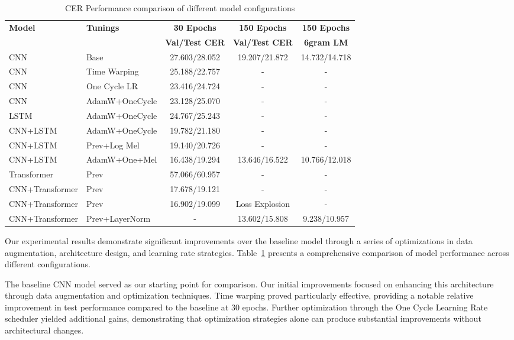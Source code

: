 \documentclass{article}
\begin{document}
\begin{table}
  \caption{CER Performance comparison of different model configurations}
  \label{tab:model_performance}
  \centering
  \begin{tabular}{lp{2.8cm}ccc}
  \toprule
  \textbf{Model} & \textbf{Tunings} & \textbf{30 Epochs} & \textbf{150 Epochs} & \textbf{150 Epochs} \\
  & & \textbf{Val/Test CER} & \textbf{Val/Test CER} & \textbf{6gram LM} \\
  \midrule
  CNN & Base & 27.603/28.052 & 19.207/21.872 & 14.732/14.718 \\
  CNN & Time Warping & 25.188/22.757 & - & - \\
  CNN & One Cycle LR & 23.416/24.724 & - & - \\
  CNN & AdamW+OneCycle & 23.128/25.070 & - & - \\
  LSTM & AdamW+OneCycle & 24.767/25.243 & - & - \\
  CNN+LSTM & AdamW+OneCycle & 19.782/21.180 & - & - \\
  CNN+LSTM & Prev+Log Mel & 19.140/20.726 & - & - \\
  CNN+LSTM & AdamW+One+Mel & 16.438/19.294 & 13.646/16.522 & 10.766/12.018\\
  Transformer & Prev & 57.066/60.957 & - & - \\
  CNN+Transformer & Prev & 17.678/19.121 & - & - \\
  CNN+Transformer & Prev & 16.902/19.099 & Loss Explosion & - \\
  CNN+Transformer & Prev+LayerNorm & - & 13.602/15.808 & 9.238/10.957 \\
  \bottomrule
  \end{tabular}
  \end{table}
  
  
  \sloppy
  Our experimental results demonstrate significant improvements over the baseline model through a series of optimizations in data augmentation, architecture design, and learning rate strategies. Table~\ref{tab:model_performance} presents a comprehensive comparison of model performance across different configurations.

  The baseline CNN model served as our starting point for comparison. Our initial improvements focused on enhancing this architecture through data augmentation and optimization techniques. Time warping proved particularly effective, providing a notable relative improvement in test performance compared to the baseline at 30 epochs. Further optimization through the One Cycle Learning Rate scheduler yielded additional gains, demonstrating that optimization strategies alone can produce substantial improvements without architectural changes.
  
\end{document}
